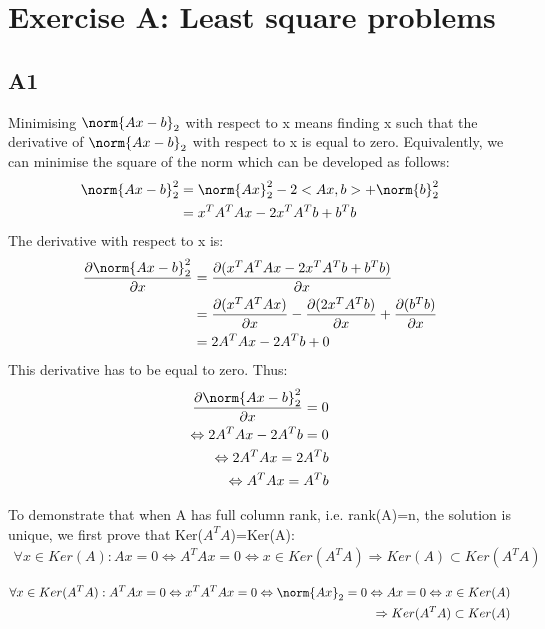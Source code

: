 \documentclass[11pt]{article}
\newcommand{\snorm}[1]{\norm{#1}_2} %
\begin{document}
\section*{Exercise A: Least square problems}
\subsection*{A1}
Minimising $\snorm{Ax - b}$ with respect to x means finding x such that the derivative of $\snorm{Ax - b}$ with respect to x is equal to zero. Equivalently, we can minimise the square of the norm which can be developed as follows:
\begin{align*}
    \snorm{Ax - b}^2 &= \snorm{Ax}^2 - 2 <Ax,b> + \snorm{b}^2 \\
    &= x^{T}A^{T}Ax - 2x^{T}A^{T}b + b^{T}b 
\end{align*}
The derivative with respect to x is: \\
\begin{align*}
    \frac{\partial \snorm{Ax - b}^2}{\partial x} &= \frac{\partial(x^{T}A^{T}Ax - 2x^{T}A^{T}b + b^{T}b)}{\partial x} \\
    &= \frac{\partial(x^{T}A^{T}Ax)}{\partial x} - \frac{\partial(2x^{T}A^{T}b)}{\partial x} + \frac{\partial(b^{T}b)}{\partial x} \\
    &= 2A^{T}Ax - 2A^{T}b + 0
\end{align*}
This derivative has to be equal to zero. Thus: \\
\begin{align*}
    \frac{\partial \snorm{Ax - b}^2}{\partial x} = 0 \\
    \Leftrightarrow 2A^{T}Ax - 2A^{T}b = 0 \\
    \Leftrightarrow 2A^{T}Ax = 2A^{T}b \\
    \Leftrightarrow A^{T}Ax = A^{T}b
\end{align*}

To demonstrate that when A has full column rank, i.e. rank(A)=n, the solution is unique, we first prove that Ker($A^{T}A$)=Ker(A): \\
\begin{align*}
    \forall x \in Ker(A): Ax = 0 \Leftrightarrow A^{T}Ax = 0 \Leftrightarrow x \in Ker(A^{T}A) \Rightarrow Ker(A) \subset Ker(A^{T}A)
\end{align*}

\begin{align*}
    \forall x \in Ker(A^{T}A): A^{T}Ax = 0 \Leftrightarrow x^{T}A^{T}Ax = 0 \Leftrightarrow \snorm{Ax} = 0 \Leftrightarrow Ax = 0 \Leftrightarrow x \in Ker(A) \\
    \Rightarrow Ker(A^{T}A) \subset Ker(A)
\end{align*}
\end{document}
